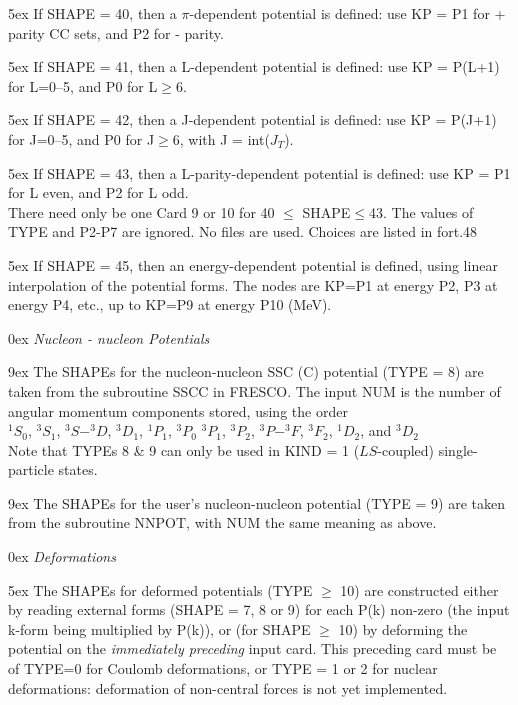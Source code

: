 \documentclass[11pt]{article}
\begin{document}
\hangindent 5ex
If SHAPE = 40, then a $\pi$-dependent potential is defined:
use KP = P1 for + parity CC sets, and P2 for - parity.

\hangindent 5ex
If SHAPE = 41, then a L-dependent potential is defined:
use KP = P(L+1) for L=0--5, and P0 for L$\geq$6.

\hangindent 5ex
If SHAPE = 42, then a J-dependent potential is defined:
use KP = P(J+1) for J=0--5, and P0 for J$\geq$6, with J = int($J_T$).

\hangindent 5ex
If SHAPE = 43, then a L-parity-dependent potential is defined:
use KP = P1 for L even, and P2 for L odd.
\\
There need only be one Card 9 or 10 for 40 $\leq$ SHAPE$\leq$43. The values of TYPE
and P2-P7 are ignored. No files are used. Choices are listed in fort.48

\hangindent 5ex
If SHAPE = 45, then an energy-dependent potential is defined, using linear interpolation of the potential forms.
The nodes are KP=P1 at energy P2, P3 at energy P4, etc., up to KP=P9 at energy P10 (MeV).


\hangindent 0ex
\bigskip
{\em Nucleon - nucleon Potentials}
\bigskip

\hangindent 9ex
The SHAPEs for the nucleon-nucleon SSC (C) potential (TYPE = 8) are
taken from the subroutine SSCC in FRESCO.
The input NUM is the number of angular momentum components stored,
using the order
\\
 $^1S_{0}$, $^3S_{1}$, $^3S-^3D$, $^3D_{1}$, $^1P_{1}$, $^3P_{0}$
$^3P_{1}$, $^3P_2$, $^3P-^3F$, $^3F_2$, $^1D_2$, and $^3D_2$
\\
Note that TYPEs 8 \& 9 can only be used in KIND = 1 ($LS$-coupled)
single-particle states.
\bigskip

\hangindent 9ex
The SHAPEs for the user's nucleon-nucleon potential (TYPE = 9) are
taken from the subroutine NNPOT, with NUM the same meaning as above.



\hangindent 0ex
\bigskip
{\em Deformations}

\hangindent 5ex
The SHAPEs for deformed potentials (TYPE $\geq$ 10) are constructed either
by reading external forms (SHAPE = 7, 8 or 9) for each P(k) non-zero
(the input k-form being multiplied by P(k)),
or (for SHAPE $\geq$ 10) by deforming the potential on the
{\em immediately preceding} input card.
This preceding card must be of TYPE=0 for Coulomb deformations,
or TYPE = 1 or 2 for nuclear deformations: deformation of non-central
forces is not yet implemented.
\bigskip
\end{document}
